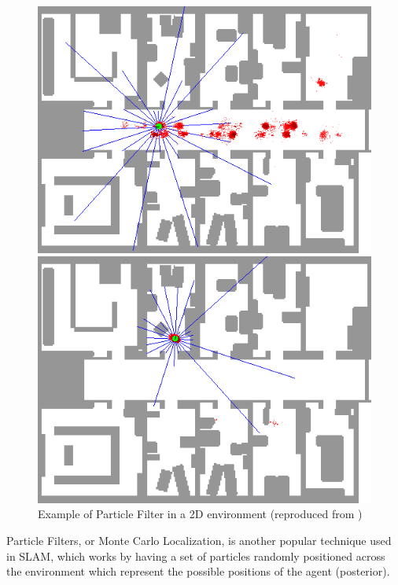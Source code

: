 \documentclass[12pt]{article}
\begin{document}
\begin{figure}[h]
\begin{minipage}{0.24\textwidth}
        \includegraphics[width=\linewidth]{frame_07_delay-1s}
    \end{minipage}
    \begin{minipage}{0.24\textwidth}
        \centering
        \includegraphics[width=\linewidth]{frame_25_delay-1s}
    \end{minipage}
    \caption[Short caption]{Example of Particle Filter in a 2D environment (reproduced from \cite{particle_filter})}
    \label{fig:particle_filter}
\end{figure}
Particle Filters, or Monte Carlo Localization, is another popular technique used in SLAM, which works by having a set of
particles randomly positioned across the environment which represent the possible positions of the agent (posterior).
\end{document}
